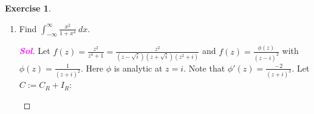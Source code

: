 \documentclass[12pt,openany]{book}
\theoremstyle{definition}
\newtheorem{exercise}{Exercise}[section]
\newcommand{\of}[1]{\left( #1 \right)}
\newcommand{\abs}[1]{\left\lvert #1 \right\rvert}
\newcommand{\sol}{\textcolor{magenta}{\bf Sol}}
\newcommand{\res}{\textnormal{res}}
\begin{document}
\begin{exercise}
\begin{enumerate}
\begin{proof}[\sol]
\begin{center}
				\end{center} then \[
				\res\of{f(z)e^{iaz},i}=\res\of{\frac{\phi(z)}{z-i},i}=\phi(i)=\frac{e^{-a}}{2i}=-\frac{1}{2e^a}=\begin{cases}
					-\frac{1}{2e^a}&: a\geq 0\\
					\frac{1}{2}e^a&: a<0
				\end{cases}.
				\] Consider $
				\displaystyle\oint_C f(z)e^{iaz}\ dz=\underbrace{\int_{C_R}f(z)e^{iaz}\ dz}_{=(1)}+\underbrace{\int_{I_R}f(z)e^{iaz}\ dz}_{=(2)}.
				$ \begin{enumerate}[(1)]
					\item Note that $\abs{f(z)}=\abs{\frac{1}{z^2+1}}\leq\frac{1}{\abs{z}^2-1}=\frac{1}{R^2-1}=:M_R$. Then \[
					\abs{f(z)}\leq M_R\quad\text{and}\quad M_R=\frac{1}{R^2-1}\to 0\quad\text{as $R\to\infty$},
					\] and so $\lim\limits_{R\to\infty}\int_{C_R}f(z)e^{ia z}\ dz=0$ by Jordan's Lemma.
					\item \[
					\int_{I_R}f(z)e^{iaz}\ dz=\int_{-R}^R\frac{1}{x^2+1}\cos(ax)\ dx+i\int_{-R}^R\frac{1}{x^2+1}\sin(ax)\ dx.
					\]
				\end{enumerate}
				Therefore \begin{align*}
					\lim\limits_{R\to\infty}\oint_C f(z)e^{iaz}\ dz&=\int_{-\infty}^{\infty}\frac{1}{x^2+1}\cos(ax)\ dx+i\int_{-\infty}^{\infty}\frac{1}{x^2+1}\sin(ax)\ dx\\
					&=2\pi i\cdot\res\of{f(z)e^{iaz}, i}\\
					&=\begin{cases}
						\pi e^{-a}i&: a\geq 0\\
						\pi e^ai&: a<0
					\end{cases}.
				\end{align*} Hence \[
				\int_{-\infty}^{\infty}\frac{x}{x^2+4}\sin x\ dx=\frac{\pi}{e^2}.
				\]
			\end{proof}
			\vspace{8pt}
			\item Find $\displaystyle\int_{-\infty}^{\infty}\frac{x^2}{1+x^4}\ dx$.
			\begin{proof}[\sol]
				Let $f(z)=\displaystyle\frac{z^2}{z^4+1}=\frac{z^2}{(z-\sqrt{i})(z+\sqrt{i})(z^2+i)}$ and $f(z)=\frac{\phi(z)}{(z-i)^2}$ with $\phi(z)=\frac{1}{(z+i)^2}$. Here $\phi$ is analytic at $z=i$. Note that $\phi'(z)=\frac{-2}{(z+i)^3}$. Let $C:=C_R+I_R$: \begin{center}

\end{center}
\end{proof}
\end{enumerate}
\end{exercise}
\end{document}
